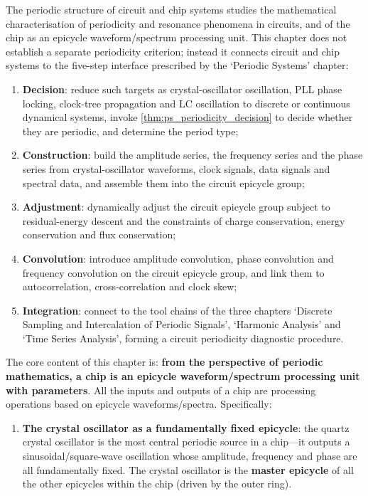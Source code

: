 \begin{remark}\label{rem:circuit_five_steps_positioning}
The periodic structure of circuit and chip systems studies the mathematical characterisation of periodicity and resonance phenomena in circuits, and of the chip as an epicycle waveform/spectrum processing unit. This chapter does not establish a separate periodicity criterion; instead it connects circuit and chip systems to the five-step interface prescribed by the `Periodic Systems' chapter:
\begin{enumerate}[label=(\arabic*)]
    \item \textbf{Decision}: reduce such targets as crystal-oscillator oscillation, PLL phase locking, clock-tree propagation and LC oscillation to discrete or continuous dynamical systems, invoke \cref{thm:ps_periodicity_decision} to decide whether they are periodic, and determine the period type;
    \item \textbf{Construction}: build the amplitude series, the frequency series and the phase series from crystal-oscillator waveforms, clock signals, data signals and spectral data, and assemble them into the circuit epicycle group;
    \item \textbf{Adjustment}: dynamically adjust the circuit epicycle group subject to residual-energy descent and the constraints of charge conservation, energy conservation and flux conservation;
    \item \textbf{Convolution}: introduce amplitude convolution, phase convolution and frequency convolution on the circuit epicycle group, and link them to autocorrelation, cross-correlation and clock skew;
    \item \textbf{Integration}: connect to the tool chains of the three chapters `Discrete Sampling and Intercalation of Periodic Signals', `Harmonic Analysis' and `Time Series Analysis', forming a circuit periodicity diagnostic procedure.
\end{enumerate}
The core content of this chapter is: \textbf{from the perspective of periodic mathematics, a chip is an epicycle waveform/spectrum processing unit with parameters}. All the inputs and outputs of a chip are processing operations based on epicycle waveforms/spectra. Specifically:
\begin{enumerate}[label=(\arabic*)]
    \item \textbf{The crystal oscillator as a fundamentally fixed epicycle}: the quartz crystal oscillator is the most central periodic source in a chip---it outputs a sinusoidal/square-wave oscillation whose amplitude, frequency and phase are all fundamentally fixed. The crystal oscillator is the \textbf{master epicycle} of all the other epicycles within the chip (driven by the outer ring).

\end{enumerate}
\end{remark}
